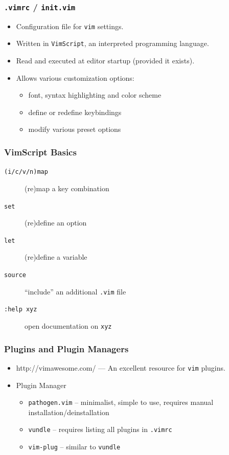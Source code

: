 \documentclass{beamer}
\begin{document}
\begin{frame}
    \frametitle{\texttt{.vimrc} / \texttt{init.vim}}
    \begin{itemize}
        \item Configuration file for \texttt{vim} settings.
        \item Written in \texttt{VimScript}, an interpreted programming language.
        \item Read and executed at editor startup (provided it exists).
        \item Allows various customization options:
        \begin{itemize}
            \item font, syntax highlighting and color scheme
            \item define or redefine keybindings
            \item modify various preset options
        \end{itemize}
    \end{itemize}
\end{frame}
\begin{frame}
    \frametitle{VimScript Basics}
    \begin{description}
        \item [\texttt{(i/c/v/n)map}] (re)map a key combination
        \item [\texttt{set}] (re)define an option
        \item [\texttt{let}] (re)define a variable
        \item [\texttt{source}] ``include'' an additional \texttt{.vim} file
        \item [\texttt{:help xyz}] open documentation on \texttt{xyz}
    \end{description}
\end{frame}
\begin{frame}
    \frametitle{Plugins and Plugin Managers}
    \begin{itemize}
        \item http://vimawesome.com/ --- An excellent resource for \texttt{vim} plugins.
        \item Plugin Manager
        \begin{itemize}
            \item \texttt{pathogen.vim} -- minimalist, simple to use, requires manual installation/deinstallation
            \item \texttt{vundle} -- requires listing all plugins in \texttt{.vimrc}
            \item \texttt{vim-plug} -- similar to \texttt{vundle}
        \end{itemize}
    \end{itemize}
\end{frame}
\end{document}
